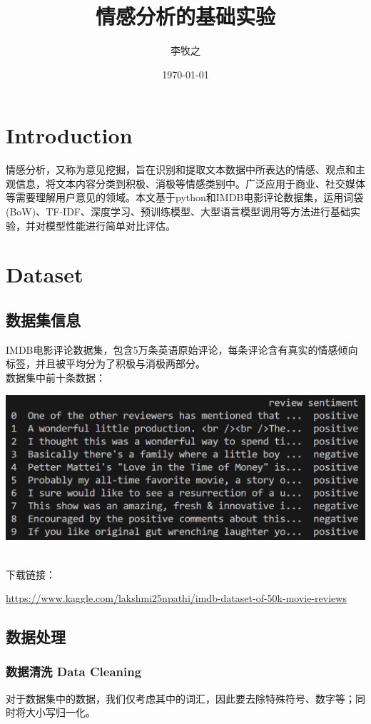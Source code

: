 \documentclass{article}
\title{情感分析的基础实验}
\author{李牧之}
\date{\today}
\begin{document}
\maketitle 

\section{Introduction}
情感分析，又称为意见挖掘，旨在识别和提取文本数据中所表达的情感、观点和主观信息，将文本内容分类到积极、消极等情感类别中。广泛应用于商业、社交媒体等需要理解用户意见的领域。本文基于python和IMDB电影评论数据集，运用词袋(BoW)、TF-IDF、深度学习、预训练模型、大型语言模型调用等方法进行基础实验，并对模型性能进行简单对比评估。

\section{Dataset}

\subsection{数据集信息}
IMDB电影评论数据集，包含5万条英语原始评论，每条评论含有真实的情感倾向标签，并且被平均分为了积极与消极两部分。
\\数据集中前十条数据：
\begin{center}
\includegraphics[scale=0.3]{PNG2.png}
\end{center}
\\下载链接：

\url{https://www.kaggle.com/lakshmi25npathi/imdb-dataset-of-50k-movie-reviews}

\subsection{数据处理}
\subsubsection{数据清洗 Data Cleaning}
对于数据集中的数据，我们仅考虑其中的词汇，因此要去除特殊符号、数字等；同时将大小写归一化。
\end{document}
